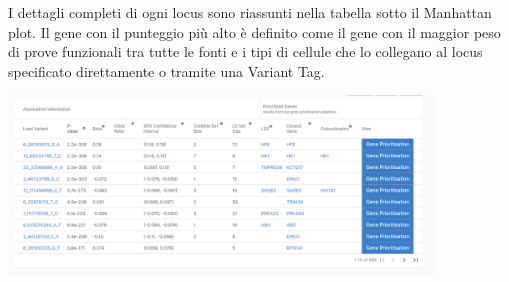 \documentclass{article}
\begin{document}
I dettagli completi di ogni locus sono riassunti nella tabella sotto il Manhattan plot. Il gene con il punteggio più alto è definito come il gene con il maggior peso di prove funzionali tra tutte le fonti e i tipi di cellule che lo collegano al locus specificato direttamente o tramite una Variant Tag. 
\begin{center}
    \includegraphics[width=0.85\textwidth]{figures/6-Study.png}
\end{center}
\end{document}
